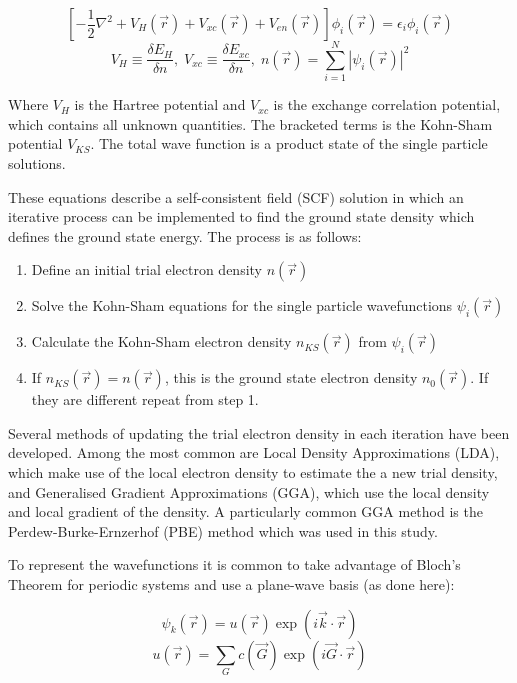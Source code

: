 \documentclass[a4paper,12pt]{article}
\begin{document}
\begin{equation}
\left[ -\frac{1}{2}\nabla^2 + V_H(\vec{r}) + V_{xc}(\vec{r}) + V_{en}(\vec{r}) \right] \phi_i(\vec{r}) = \epsilon_i \phi_i(\vec{r})
\end{equation}
\[
V_H\equiv\frac{\delta E_H}{\delta n}, \; V_{xc}\equiv\frac{\delta E_{xc}}{\delta n}, \; n(\vec{r})=\sum_{i=1}^{N}|\psi_i(\vec{r})|^2
\]

\smallskip
\noindent Where $V_H$ is the Hartree potential and $V_{xc}$ is the exchange correlation potential, which contains all unknown quantities. The bracketed terms is the Kohn-Sham potential $V_{KS}$. The total wave function is a product state of the single particle solutions.

\bigskip
\noindent These equations describe a self-consistent field (SCF) solution in which an iterative process can be implemented to find the ground state density which defines the ground state energy. The process is as follows:

\begin{enumerate}
	\item Define an initial trial electron density $n(\vec{r})$
	\item Solve the Kohn-Sham equations for the single particle wavefunctions $\psi_i(\vec{r})$
	\item Calculate the Kohn-Sham electron density $n_{KS}(\vec{r})$ from $\psi_i(\vec{r})$
	\item If $n_{KS}(\vec{r}) = n(\vec{r})$, this is the ground state electron density $n_0(\vec{r})$. If they are different repeat from step 1.
\end{enumerate}

\noindent Several methods of updating the trial electron density in each iteration have been developed. Among the most common are Local Density Approximations (LDA), which make use of the local electron density to estimate the a new trial density, and Generalised Gradient Approximations (GGA), which use the local density and local gradient of the density. A particularly common GGA method is the Perdew-Burke-Ernzerhof (PBE) method \cite{pbe} which was used in this study.

\bigskip
\noindent To represent the wavefunctions it is common to take advantage of Bloch's Theorem for periodic systems and use a plane-wave basis (as done here):

\begin{equation}
\psi_k(\vec{r}) = u(\vec{r}) \exp(i\vec{k}\cdot\vec{r})
\end{equation}
\[
u(\vec{r}) = \sum_{G}c(\vec{G})\exp(i\vec{G}\cdot\vec{r})
\]
\end{document}
